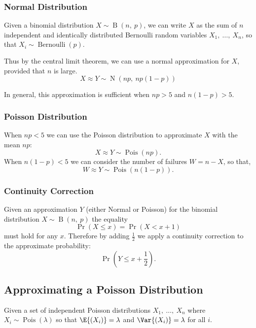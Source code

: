\documentclass{article}
\begin{document}
\subsubsection{Normal Distribution}
Given a binomial distribution \(X \sim \operatorname{B}{\left( n,\: p \right)}\), we can write \(X\)
as the sum of \(n\) independent and identically distributed Bernoulli random variables
\(X_1,\: \ldots,\: X_n\), so that \(X_i \sim \operatorname{Bernoulli}{\left( p \right)}\).

Thus by the central limit theorem, we can use a normal approximation for \(X\), provided that \(n\) is large.
\begin{equation*}
    X \approx Y \sim \operatorname{N}{\left( np,\: np\left( 1 - p \right) \right)}
\end{equation*}

In general, this approximation is sufficient when \(np > 5\) and \(n\left( 1 - p \right) > 5\).
\subsubsection{Poisson Distribution}
When \(np < 5\) we can use the Poisson distribution to approximate \(X\) with the mean \(np\):
\begin{equation*}
    X \approx Y \sim \operatorname{Pois}{\left( np \right)}.
\end{equation*}
When \(n\left( 1 - p \right) < 5\) we can consider the number of failures \(W = n - X\), so that,
\begin{equation*}
    W \approx Y \sim \operatorname{Pois}{\left( n\left( 1 - p \right) \right)}.
\end{equation*}
\subsubsection{Continuity Correction}
Given an approximation \(Y\) (either Normal or Poisson) for the binomial distribution \(X \sim \operatorname{B}{\left( n,\: p \right)}\) the equality 
\begin{equation*}
    \Pr{\left( X \leq x \right)} = \Pr{\left( X < x + 1 \right)}
\end{equation*}
must hold for any \(x\). Therefore by adding \(\frac{1}{2}\) we apply a continuity correction to the approximate probability:
\begin{equation*}
    \Pr{\left( Y \leq x + \frac{1}{2} \right)}.
\end{equation*}
\subsection{Approximating a Poisson Distribution}
Given a set of independent Poisson distributions \(X_1,\: \ldots ,\: X_n\) where \(X_i \sim \operatorname{Pois}{\left( \lambda \right)}\)
so that \(\E{\left( X_i \right)} = \lambda\) and \(\Var{\left( X_i \right)} = \lambda\) for all \(i\).
\end{document}
